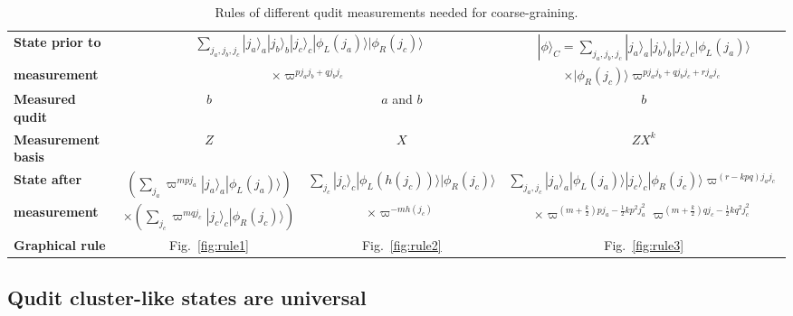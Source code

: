 \documentclass[aps,amsfonts,pra,twocolumn,showpacs]{revtex4-1}
\begin{document}
	
\begin{table*}[ht]
\begin{center}
	\begin{tabular}{ l | c | c | c }
	\hline
	\textbf{State prior to} & \multicolumn{2}{|c|}{$\sum_{j_a, j_b, j_c} |j_a\rangle_a |j_b\rangle_b |j_c\rangle_c |\phi_L(j_a)\rangle |\phi_R(j_c)\rangle$} & $|\phi\rangle_C = \sum_{j_a, j_b, j_c} |j_a\rangle_a |j_b\rangle_b |j_c\rangle_c |\phi_L(j_a)\rangle$ \\
	\textbf{measurement} & \multicolumn{2}{|c|}{$\times \varpi^{pj_aj_b+qj_bj_c}$} & $\times |\phi_R(j_c)\rangle \varpi^{pj_aj_b+qj_bj_c+rj_aj_c}$ \\
	\hline
	\textbf{Measured qudit} & $b$ & $a$ and $b$ & $b$ \\
	\hline
	\textbf{Measurement basis} & $Z$ & $X$ & $ZX^k$ \\
	\hline
	\textbf{State after} & $\left( \sum_{j_a}\varpi^{mpj_a}|j_a\rangle_a|\phi_L(j_a)\rangle \right)$ & $\sum_{j_c} |j_c\rangle_c |\phi_L(h(j_c))\rangle |\phi_R(j_c)\rangle$ & $\sum_{j_a, j_c} |j_a\rangle_a| \phi_L(j_a)\rangle |j_c\rangle_c|\phi_R(j_c)\rangle \varpi^{(r-kpq)j_aj_c}$ \\
	\textbf{measurement} & $\times \left( \sum_{j_c}\varpi^{mqj_c}|j_c\rangle_c|\phi_R(j_c)\rangle \right)$ & $\times \varpi^{-mh(j_c)}$ & $\times \varpi^{(m+\frac{k}{2})pj_a-\frac{1}{2}kp^2j_a^2} \varpi^{(m+\frac{k}{2})qj_c-\frac{1}{2}kq^2j_c^2}$ \\
	\hline
	\textbf{Graphical rule} & Fig.~\ref{fig:rule1} & Fig.~\ref{fig:rule2} & Fig.~\ref{fig:rule3} \\
	\hline
	\end{tabular}
	\caption{Rules of different qudit measurements needed for coarse-graining. \label{tab:rules}}
\end{center}
\end{table*}


	\subsection{Qudit cluster-like states are universal} \label{sec:cluster-like}
\end{document}
